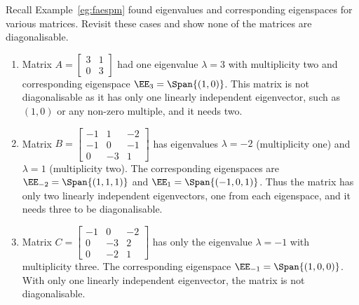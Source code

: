 \begin{example} \label{eg:faespmp}
Recall Example~\ref{eg:faespm} found eigenvalues and corresponding eigenspaces for various matrices.
Revisit these cases and show none of the matrices are diagonalisable.
\begin{enumerate}
\item Matrix \(A=\begin{bmatrix} 3&1\\0&3 \end{bmatrix}\) had one eigenvalue \(\lambda=3\) with multiplicity two and corresponding eigenspace \(\EE_3=\Span\{(1,0)\}\).
This matrix is not diagonalisable as it has only one linearly independent eigenvector, such as~\((1,0)\) or any non-zero multiple, and it needs two. 

\item Matrix \(B=\begin{bmatrix}-1&1&-2
\\-1&0&-1
\\0&-3&1 \end{bmatrix}\)
has eigenvalues  \(\lambda=-2\) (multiplicity one) and \(\lambda=1\) (multiplicity two).
The corresponding eigenspaces are \(\EE_{-2}=\Span\{(1,1,1)\}\) and \(\EE_{1}=\Span\{(-1,0,1)\}\).
Thus the matrix has only two linearly independent eigenvectors, one from each eigenspace, and it needs three to be diagonalisable.

\item Matrix \(C=\begin{bmatrix}-1&0&-2
\\0&-3&2
\\0&-2&1\end{bmatrix}\)
has only the eigenvalue \(\lambda=-1\) with multiplicity three.
The corresponding eigenspace \(\EE_{-1}=\Span\{(1,0,0)\}\).
With only one linearly independent eigenvector, the matrix is not diagonalisable.

\end{enumerate}
\end{example}


